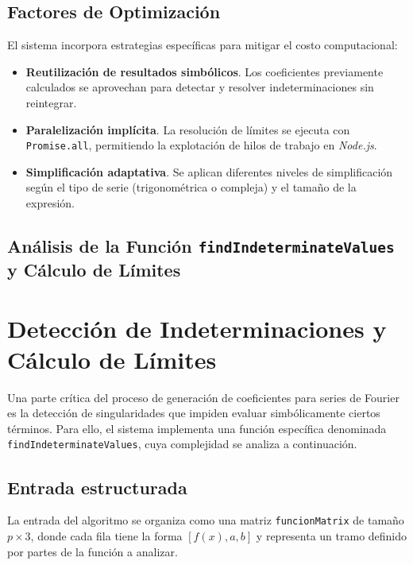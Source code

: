 \subsection{Factores de Optimización}

El sistema incorpora estrategias específicas para mitigar el costo
computacional:

\begin{itemize}
	\item \textbf{Reutilización de resultados simbólicos}.  
	Los coeficientes previamente calculados se aprovechan para
	detectar y resolver indeterminaciones sin reintegrar.
	\item \textbf{Paralelización implícita}.  
	La resolución de límites se ejecuta con \texttt{Promise.all},
	permitiendo la explotación de hilos de trabajo en \textit{Node.js}.
	\item \textbf{Simplificación adaptativa}.  
	Se aplican diferentes niveles de simplificación según el tipo de
	serie (trigonométrica o compleja) y el tamaño de la expresión.
\end{itemize}

 \subsection{Análisis de la Función \texttt{findIndeterminateValues} y Cálculo de Límites}
\section{Detección de Indeterminaciones y Cálculo de Límites}

Una parte crítica del proceso de generación de coeficientes para series
de Fourier es la detección de singularidades que impiden evaluar
simbólicamente ciertos términos.  
Para ello, el sistema implementa una función específica denominada
\texttt{findIndeterminateValues}, cuya complejidad se analiza a
continuación.

\subsection{Entrada estructurada}

La entrada del algoritmo se organiza como una matriz
\texttt{funcionMatrix} de tamaño \( p \times 3 \), donde cada fila tiene
la forma \([f(x), a, b]\) y representa un tramo definido por partes de la
función a analizar.  

